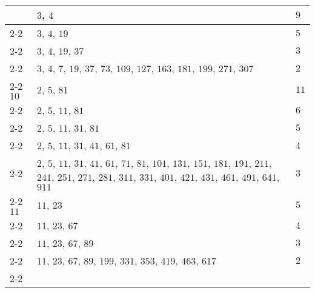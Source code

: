 \documentclass[11pt,reqno]{amsart}
\begin{document}
\begin{longtable}{ | p{1.8cm} | p{12cm} | p{1.8cm} | }
\multirow{4}{*}{} $9$ & $3$, $4$ & $9$  \\ \cline{2-2} \cline{3-3} 
                  	       & $3$, $4$, $19$ & $5$ \\ \cline{2-2} \cline{3-3} 
	      			  & $3$, $4$, $19$, $37$ & $3$ \\  \cline{2-2} \cline{3-3} 
                  	       & $3$, $4$, $7$, $19$, $37$, $73$, $109$, $127$, $163$, $181$, $199$, $271$, $307$ & $2$ \\ \cline{2-2}  \cline{3-3} \hline  \hline	      
\multirow{5}{*}{} $10$ & $2$, $5$, $81$ & $11$ \\ \cline{2-2} \cline{3-3} 
                  	           & $2$, $5$, $11$, $81$ & $6$ \\ \cline{2-2} \cline{3-3} 
	      			      & $2$, $5$, $11$, $31$, $81$ & $5$ \\ \cline{2-2} \cline{3-3} 
				 	      & $2$, $5$, $11$, $31$, $41$, $61$, $81$ & $4$ \\ \cline{2-2} \cline{3-3} 
                  	           & $2$, $5$, $11$, $31$, $41$, $61$, $71$, $81$, $101$, $131$, $151$, $181$, $191$, $211$, $241$, $251$, $271$, $281$, $311$, $331$, $401$, $421$, $431$, $461$, $491$, $641$, $911$ & $3$ \\ \cline{2-2}  \cline{3-3} \hline  \hline    
\multirow{4}{*}{} $11$ & $11$, $23$ & $5$ \\ \cline{2-2} \cline{3-3} 
                  	           & $11$, $23$, $67$ & $4$ \\ \cline{2-2} \cline{3-3} 
	      			      & $11$, $23$, $67$, $89$ & $3$ \\ \cline{2-2} \cline{3-3} 
				 	      & $11$, $23$, $67$, $89$, $199$, $331$, $353$, $419$, $463$, $617$ & $2$ \\ \cline{2-2} \cline{3-3} \hline     	              
\end{longtable}
\end{document}
